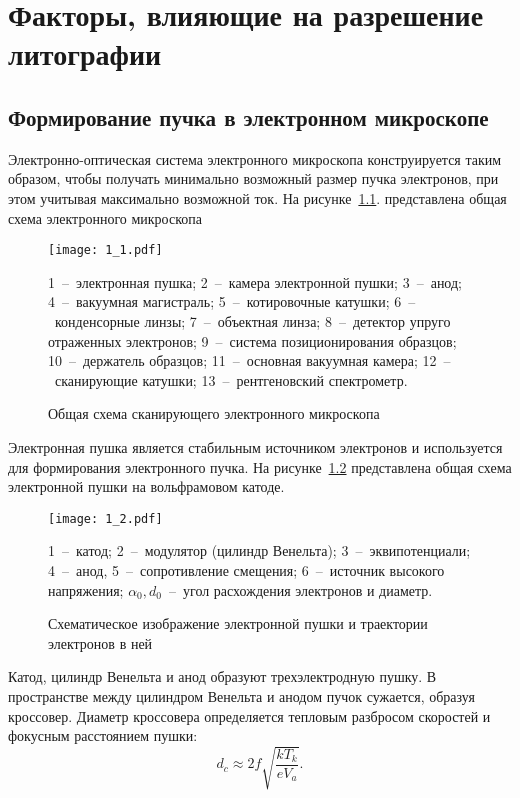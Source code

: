 \chapter{Факторы, влияющие на разрешение литографии}
\section{Формирование пучка в электронном микроскопе}

Электронно-оптическая система электронного микроскопа конструируется таким образом, чтобы получать минимально возможный размер пучка электронов, при этом учитывая максимально возможной ток. На рисунке~\ref{fig:1}. представлена общая схема электронного микроскопа

\begin{figure}[H]
\center
\texttt{[image: 1\_1.pdf]}
\parbox[t]{.7\textwidth}{\small
1~--~электронная пушка; 2~--~камера электронной пушки; 3~--~анод; 4~--~вакуумная магистраль; 5~--~котировочные катушки; 6~--~конденсорные линзы; 7~--~объектная линза; 8~--~детектор упруго отраженных электронов; 9~--~система позиционирования образцов; 10~--~держатель образцов; 11~--~основная вакуумная камера; 12~--~сканирующие катушки; 13~--~рентгеновский спектрометр.}
\caption{Общая схема сканирующего электронного микроскопа}
\label{fig:1}
\end{figure}

Электронная пушка является стабильным источником электронов и используется для формирования электронного пучка. На рисунке~\ref{fig:2} представлена общая схема электронной пушки на вольфрамовом катоде.

\begin{figure}[H]
\center
\texttt{[image: 1\_2.pdf]}
\parbox[t]{.7\textwidth}{\small
1~--~катод; 2~--~модулятор (цилиндр Венельта); 3~--~эквипотенциали; 4~--~анод, 5~--~сопротивление смещения; 6~--~источник высокого напряжения; $\alpha_0, d_0$~--~угол расхождения электронов и диаметр.}
\caption{Схематическое изображение электронной пушки и траектории электронов в ней}
\label{fig:2}
\end{figure}

Катод, цилиндр Венельта и анод образуют трехэлектродную пушку. В пространстве между цилиндром Венельта и анодом пучок сужается, образуя кроссовер.
Диаметр кроссовера определяется тепловым разбросом скоростей и фокусным расстоянием пушки:
\begin{equation}
d_c \approx 2f \sqrt{\frac{kT_k}{eV_a}}.
\label{eq:A1}
\end{equation}

